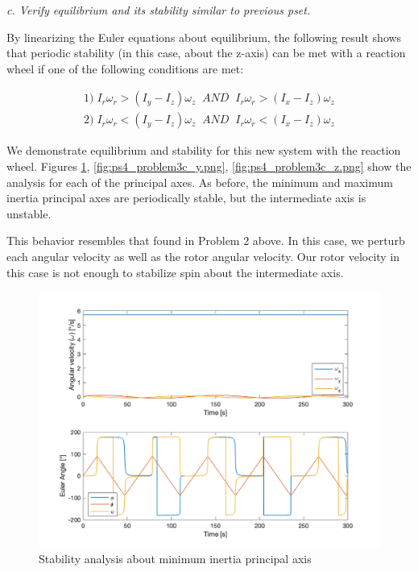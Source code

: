 \textit{c. Verify equilibrium and its stability similar to previous pset.}

By linearizing the Euler equations about equilibrium, the following result shows that periodic stability (in this case, about the z-axis) can be met with a reaction wheel if one of the following conditions are met:

\begin{align*}
    1)\; I_r \omega_r > (I_y - I_z) \omega_z \;\; AND \;\; I_r \omega_r > (I_x - I_z) \omega_z \\
    2)\; I_r \omega_r < (I_y - I_z) \omega_z \;\; AND \;\; I_r \omega_r < (I_x - I_z) \omega_z
\end{align*}

We demonstrate equilibrium and stability for this new system with the reaction wheel. Figures \ref{fig:ps4_problem3c_x.png}, \ref{fig:ps4_problem3c_y.png}, \ref{fig:ps4_problem3c_z.png} show the analysis for each of the principal axes. As before, the minimum and maximum inertia principal axes are periodically stable, but the intermediate axis is unstable.

This behavior resembles that found in Problem 2 above. In this case, we perturb each angular velocity as well as the rotor angular velocity. Our rotor velocity in this case is not enough to stabilize spin about the intermediate axis.

\begin{figure}[H]
\centering
\includegraphics[scale=0.6]{Images/ps4_problem3c_x.png}
\caption{Stability analysis about minimum inertia principal axis}
\label{fig:ps4_problem3c_x.png}
\end{figure}

